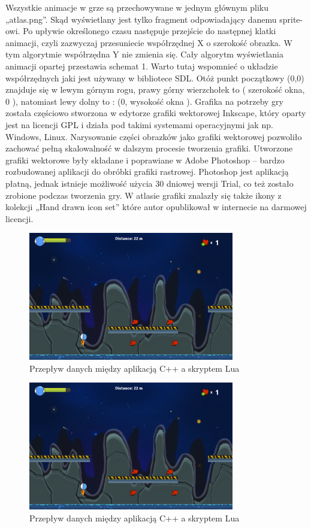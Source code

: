 Wszystkie animacje w grze są przechowywane w jednym głównym pliku „atlas.png”. Skąd wyświetlany jest tylko fragment odpowiadający danemu sprite-owi.
Po upływie określonego czasu następuje przejście do następnej klatki animacji, czyli zazwyczaj przesuniecie współrzędnej X o szerokość obrazka. W tym
algorytmie współrzędna Y nie zmienia się. Cały algorytm wyświetlania animacji opartej przestawia schemat 1.
Warto tutaj wspomnieć o układzie współrzędnych jaki jest używany w bibliotece SDL. Otóż punkt początkowy (0,0) znajduje się w lewym górnym
rogu, prawy górny wierzchołek to ( szerokość okna, 0 ), natomiast lewy dolny to : (0, wysokość okna ). Grafika na potrzeby gry została częściowo
stworzona w edytorze grafiki wektorowej Inkscape, który oparty jest na licencji GPL i działa pod takimi systemami operacyjnymi jak np. Windows, Linux.
Narysowanie części obrazków jako grafiki wektorowej pozwoliło zachować pełną skalowalność w dalszym procesie tworzenia grafiki. Utworzone grafiki
wektorowe były składane i poprawiane w Adobe Photoshop – bardzo rozbudowanej aplikacji do obróbki grafiki rastrowej. Photoshop jest aplikacją płatną,
jednak istnieje możliwość użycia 30 dniowej wersji Trial, co też zostało zrobione podczas tworzenia gry. W atlasie grafiki znalazły się także ikony z
kolekcji „Hand drawn icon set” które autor opublikował w internecie  na darmowej licencji.
\begin{figure}[h]
    \centering
    \includegraphics[width=0.8\textwidth,natwidth=510,natheight=142]{./Pictures/screen1.png}
    \caption{Przepływ danych między aplikacją C++ a skryptem Lua}
\end{figure}

\begin{figure}[h]
    \centering
    \includegraphics[width=0.8\textwidth,natwidth=410,natheight=142]{./Pictures/screen1.png}
    \caption{Przepływ danych między aplikacją C++ a skryptem Lua}
\end{figure}

